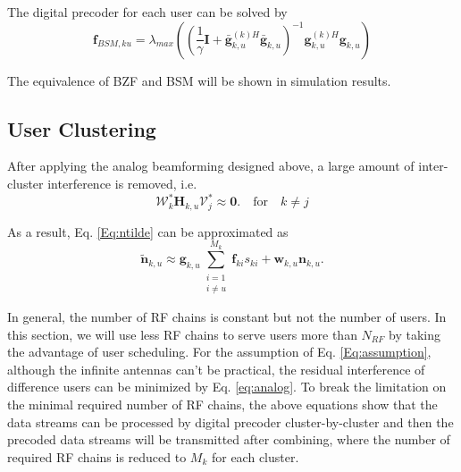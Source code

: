 \documentclass[conference]{IEEEtran}
\begin{document}
{The digital precoder for each user can be solved by \cite{wang2012statistical}
\begin{equation}
\bm{f}_{BSM,ku} = \lambda_{max}\left( \left(\frac{1}{\gamma}\bm{I}+\bar{\bm{g}}_{k,u}^{(k)H}\bar{\bm{g}}_{k,u} \right)^{-1}{\bm{g}}_{k,u}^{(k)H}{\bm{g}}_{k,u} \right)
\end{equation}

The equivalence of BZF and BSM  will be shown in simulation results.

\subsection{User Clustering}

After applying the analog beamforming designed above, a large amount of inter-cluster interference is removed, i.e.
\begin{equation}\label{approx}
\bm{\mathcal{W}}^*_{k}\bm{H}_{k,u}\bm{\mathcal{V}}^*_{j} \approx \bm{0}. \quad \text{for} \quad k \neq j
\end{equation}

As a result, Eq. \eqref{Eq:ntilde} can be approximated as
\begin{equation}
\tilde{\bm{n}}_{k,u} \approx	\bm{g}_{k,u}\sum_{\substack{i=1\\i\neq u}}^{M_k}\bm{f}_{ki}s_{ki}+\bm{w}_{k,u}\bm{n}_{k,u}.
\end{equation}

In general, the number of RF chains is constant but not the number of users. In this section, we will use less RF chains to serve users more than $N_{RF}$ by taking the advantage of user scheduling. For the assumption of Eq. \eqref{Eq:assumption},  although the infinite antennas can't be practical, the residual interference of difference users can be minimized by Eq. \eqref{eq:analog}. To break the limitation on the minimal required number of RF chains, the above equations show that the data streams can be processed by digital precoder cluster-by-cluster and then the precoded data streams will be transmitted after combining, where the number of required RF chains is reduced to $M_k$ for each cluster.



}
\end{document}
